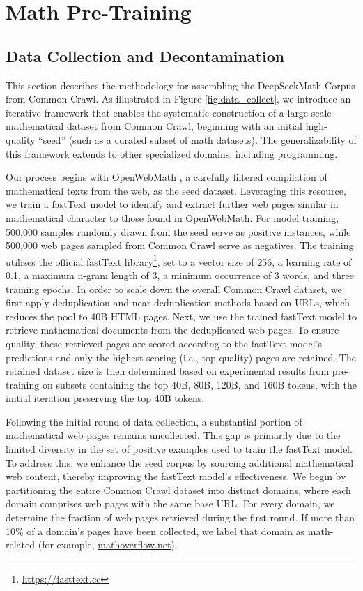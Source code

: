 \section{Math Pre-Training}

\subsection{Data Collection and Decontamination}
This section describes the methodology for assembling the DeepSeekMath Corpus from Common Crawl. As illustrated in Figure \ref{fig:data_collect}, we introduce an iterative framework that enables the systematic construction of a large-scale mathematical dataset from Common Crawl, beginning with an initial high-quality “seed” (such as a curated subset of math datasets). The generalizability of this framework extends to other specialized domains, including programming.

Our process begins with OpenWebMath \citep{openwebmath}, a carefully filtered compilation of mathematical texts from the web, as the seed dataset. Leveraging this resource, we train a fastText model \citep{joulin2016fasttext} to identify and extract further web pages similar in mathematical character to those found in OpenWebMath. For model training, 500,000 samples randomly drawn from the seed serve as positive instances, while 500,000 web pages sampled from Common Crawl serve as negatives. The training utilizes the official fastText library\footnote{\url{https://fasttext.cc}}, set to a vector size of 256, a learning rate of 0.1, a maximum n-gram length of 3, a minimum occurrence of 3 words, and three training epochs. In order to scale down the overall Common Crawl dataset, we first apply deduplication and near-deduplication methods based on URLs, which reduces the pool to 40B HTML pages. Next, we use the trained fastText model to retrieve mathematical documents from the deduplicated web pages. To ensure quality, these retrieved pages are scored according to the fastText model’s predictions and only the highest-scoring (i.e., top-quality) pages are retained. The retained dataset size is then determined based on experimental results from pre-training on subsets containing the top 40B, 80B, 120B, and 160B tokens, with the initial iteration preserving the top 40B tokens.

Following the initial round of data collection, a substantial portion of mathematical web pages remains uncollected. This gap is primarily due to the limited diversity in the set of positive examples used to train the fastText model. To address this, we enhance the seed corpus by sourcing additional mathematical web content, thereby improving the fastText model's effectiveness. We begin by partitioning the entire Common Crawl dataset into distinct domains, where each domain comprises web pages with the same base URL. For every domain, we determine the fraction of web pages retrieved during the first round. If more than 10\% of a domain's pages have been collected, we label that domain as math-related (for example, \url{mathoverflow.net}). 


